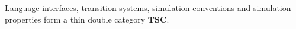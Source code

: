 \documentclass[acmsmall,screen,review,anonymous]{acmart}
\renewcommand{\preceq}{\le}
\begin{document}
\begin{theorem}
Language interfaces,
transition systems,
simulation conventions and
simulation properties
form a thin double category $\mathbf{TSC}$.
\end{theorem}


%
%
\end{document}
